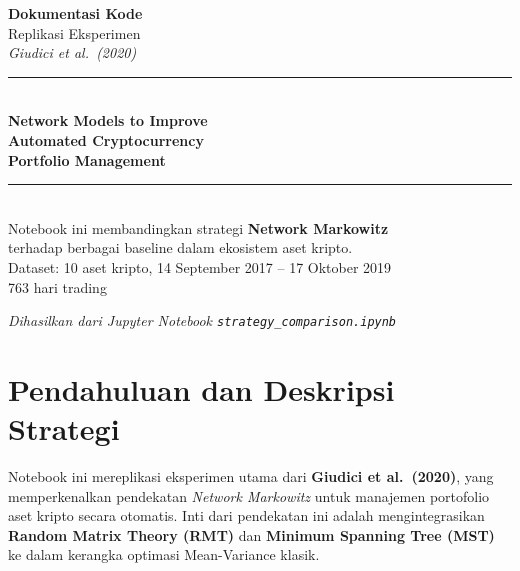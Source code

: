 \documentclass[12pt,a4paper]{article}
\begin{document}
\begin{titlepage}
  \pagecolor{titlebg}
  \color{white}
  \vspace*{2cm}
  \begin{center}
    {\Huge\bfseries Dokumentasi Kode}\\[0.8cm]
    {\Large Replikasi Eksperimen}\\[0.4cm]
    {\large\itshape Giudici et al.\ (2020)}\\[1.2cm]
    \rule{0.6\textwidth}{1pt}\\[1.2cm]
    {\LARGE\bfseries Network Models to Improve\\[0.3cm]
     Automated Cryptocurrency\\[0.3cm]
     Portfolio Management}\\[1.5cm]
    \rule{0.6\textwidth}{1pt}\\[1.2cm]
    {\normalsize Notebook ini membandingkan strategi \textbf{Network Markowitz}\\
    terhadap berbagai baseline dalam ekosistem aset kripto.}\\[2cm]
    {\small Dataset: 10 aset kripto, 14 September 2017 -- 17 Oktober 2019}\\[0.3cm]
    {\small 763 hari trading}
  \end{center}
  \vfill
  \begin{center}
    \small\textit{Dihasilkan dari Jupyter Notebook \texttt{strategy\_comparison.ipynb}}
  \end{center}
\end{titlepage}
\nopagecolor

\tableofcontents
\newpage

\section{Pendahuluan dan Deskripsi Strategi}

Notebook ini mereplikasi eksperimen utama dari \textbf{Giudici et al.\ (2020)},
yang memperkenalkan pendekatan \emph{Network Markowitz} untuk manajemen portofolio
aset kripto secara otomatis. Inti dari pendekatan ini adalah mengintegrasikan
\textbf{Random Matrix Theory (RMT)} dan \textbf{Minimum Spanning Tree (MST)}
ke dalam kerangka optimasi Mean-Variance klasik.
\end{document}
